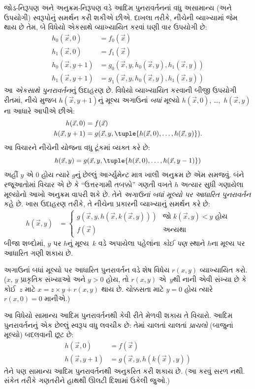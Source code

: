 \documentclass[../../../include/open-logic-section]{subfiles}
\begin{document}

જોડ-નિરૂપણ અને અનુક્રમ-નિરૂપણ વડે આદિમ પુનરાવર્તનનાં વધુ અસામાન્ય
(અને ઉપયોગી) સ્વરૂપોનું સમર્થન કરી શકીએ છીએ. દાખલા તરીકે, નીચેની
વ્યાખ્યામાં જેમ થાય છે તેમ, બે વિધેયો એકસાથે વ્યાખ્યાયિત કરવાં ઘણી
વાર ઉપયોગી છે:
\begin{align*}
h_0(\vec x, 0) & = f_0(\vec x) \\
h_1(\vec x, 0) & = f_1(\vec x) \\
h_0(\vec x, y+1) & = g_0(\vec x, y, h_0(\vec x, y), h_1(\vec x, y)) \\
h_1(\vec x, y+1) & = g_1(\vec x, y, h_0(\vec x, y), h_1(\vec x, y))
\end{align*}
આ \emph{એકસાથે પુનરાવર્તન}નું ઉદાહરણ છે. વિધેયો વ્યાખ્યાયિત
કરવાની બીજી ઉપયોગી રીતમાં, નીચે મુજબ $h(\vec x, y+1)$નું મૂલ્ય
અગાઉનાં \emph{બધાં} મૂલ્યો $h(\vec x, 0)$, \dots,~$h(\vec x, y)$ના
આધારે આપીએ છીએ:
\begin{align*}
h(\vec x, 0) & = f(\vec x) \\
h(\vec x, y+1) & = g(\vec x, y, \tuple{h(\vec x, 0), \dots, h(\vec x, y)}).
\end{align*}
આ વિચારને નીચેની યોજના વધુ ટૂંકમાં વ્યક્ત કરે છે:
\[
h(\vec x, y) = g(\vec x, y, \tuple{h(\vec x, 0), \dots, h(\vec x, y-1)})
\]
અહીં $y$ એ $0$ હોય ત્યારે $g$નું છેલ્લું આર્ગ્યુમેન્ટ માત્ર ખાલી
અનુક્રમ છે એમ સમજવું. બંને રજૂઆતોમાં વિચાર એ છે કે ``ઉત્તરગામી
તબક્કો'' ગણતી વખતે $h$ અત્યાર સુધી ગણાયેલા મૂલ્યોનો આખો અનુક્રમ
વાપરી શકે છે. તેને \emph{અગાઉનાં બધાં મૂલ્યો પર આધારિત પુનરાવર્તન}
કહે છે. ખાસ ઉદાહરણ તરીકે, તે નીચેના પ્રકારની વ્યાખ્યાનું સમર્થન કરે
છે:
\begin{align*}
h(\vec x, y) & = \begin{cases}
  g(\vec x, y, h(\vec x, k(\vec x, y))) & \text{જો $k(\vec x, y) < y$ હોય} \\
  f(\vec x) & \text{અન્યથા}
\end{cases}
\end{align*}
બીજા શબ્દોમાં, $y$ પર $h$નું મૂલ્ય~$k$ વડે અપાયેલા પહેલાંના
\emph{કોઈ પણ} સ્થાને $h$ના મૂલ્ય પર આધારિત ગણી શકાય છે.


\begin{prob}
  અગાઉનાં બધાં મૂલ્યો પર આધારિત પુનરાવર્તન વડે શેષ વિધેય
  $r(x,y)$ વ્યાખ્યાયિત કરો. ($x$, $y$ પ્રાકૃતિક સંખ્યાઓ અને
  $y > 0$ હોય, તો $r(x,y)$ એ~$y$થી નાની એવી સંખ્યા છે કે કોઈ~$z$
  માટે $x = z\times y + r(x,y)$ થાય છે. ચોક્કસતા માટે $y=0$ હોય
  ત્યારે $r(x,0) = 0$ માનીએ.)
\end{prob}

આ વિધેયો સામાન્ય આદિમ પુનરાવર્તનથી કેવી રીતે મેળવી શકાય તે
વિચારો. આદિમ પુનરાવર્તનનું એક છેલ્લું સ્વરૂપ વધુ લવચીક છે: તેમાં
ચાલતાં ચાલતાં \emph{પ્રાચલો} (બાજુનાં મૂલ્યો) બદલવાની છૂટ છે:
\begin{align*}
h(\vec x, 0) & = f(\vec x) \\
h(\vec x, y+1) & = g(\vec x, y, h(k(\vec x), y))
\end{align*}
તેને પણ સામાન્ય આદિમ પુનરાવર્તનથી અનુકરિત કરી શકાય છે. (આ કરવું
સરળ નથી. સંકેત તરીકે ગણતરીને હાથથી ઊલટી દિશામાં ઉકેલી જુઓ.)
\end{document}
